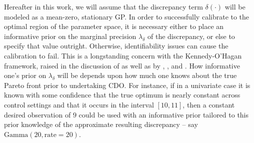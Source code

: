 \documentclass[12pt]{article}
\begin{document}


Hereafter in this work, we will assume that 
the discrepancy term $\delta(\cdot)$ will be modeled as a mean-zero, stationary GP. 
%
In order to successfully calibrate to the optimal region of the parameter space, it is necessary either to place an informative prior on the marginal precision $\lambda_\delta$ of the discrepancy, or else to specify that value outright. 
%
Otherwise, identifiability issues can cause the calibration to fail.
%
This is a longstanding concern with the Kennedy-O'Hagan framework, raised in the discussion of \cite{Kennedy2001} as well as by \cite{Bayarri2007}, \cite{Tuo2015}, and \cite{Plumlee2017}.
%
How informative one's prior on $\lambda_\delta$ will be depends upon how much one knows about the true Pareto front prior to undertaking CDO.
%
For instance, if in a univariate case it is known with some confidence that the true optimum is nearly constant across control settings and that it occurs in the interval $[10,11]$, then a constant desired observation of $9$ could be used with an informative prior tailored to this prior knowledge of the approximate resulting discrepancy -- say $\mathrm{Gamma}(20,\mathrm{rate}=20)$.
%
\end{document}
